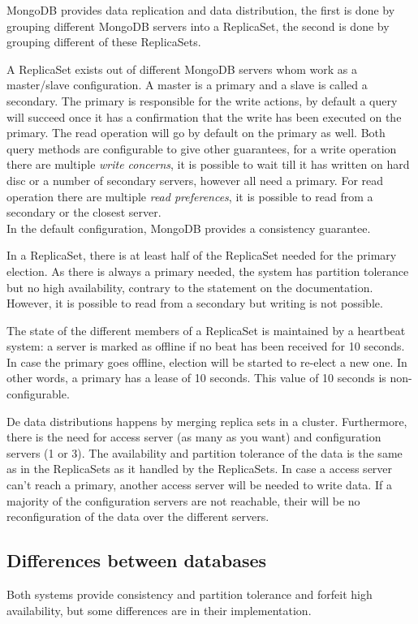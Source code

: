 \documentclass[10pt,conference,letterpaper]{IEEEtran}
\begin{document}
MongoDB provides data replication and data distribution, the first is done by grouping different MongoDB servers into a ReplicaSet, the second is done by grouping different of these ReplicaSets. 

A ReplicaSet exists out of different MongoDB servers whom work as a master/slave configuration. A master is a primary and a slave is called a secondary. The primary is responsible for the write actions, by default a query will succeed once it has a confirmation that the write has been executed on the primary. The read operation will go by default on the primary as well. Both query methods are configurable to give other guarantees, for a write operation there are multiple \textit{write concerns}, it is possible to wait till it has written on hard disc or a number of secondary servers, however all need a primary. For read operation there are multiple \textit{read preferences}, it is possible to read from a secondary or the closest server. \\ 
In the default configuration, MongoDB provides a consistency guarantee.

In a ReplicaSet, there is at least half of the ReplicaSet needed for the primary election. As there is always a primary needed, the system has partition tolerance but no high availability, contrary to the statement on the documentation. However, it is possible to read from a secondary but writing is not possible.

The state of the different members of a ReplicaSet is maintained by a heartbeat system: a server is marked as offline if no beat has been received for 10 seconds. In case the primary goes offline, election will be started to re-elect a new one. In other words, a primary has a lease of 10 seconds. This value of 10 seconds is non-configurable. 

De data distributions happens by merging replica sets in a cluster. Furthermore, there is the need for access server (as many as you want) and configuration servers (1 or 3). The availability and partition tolerance of the data is the same as in the ReplicaSets as it handled by the ReplicaSets. In case a access server can't reach a primary, another access server will be needed to write data. If a majority of the configuration servers are not reachable, their will be no reconfiguration of the data over the different servers.  

\subsection{Differences between databases} 
Both systems provide consistency and partition tolerance and forfeit high availability, but some differences are in their implementation. 
\end{document}
